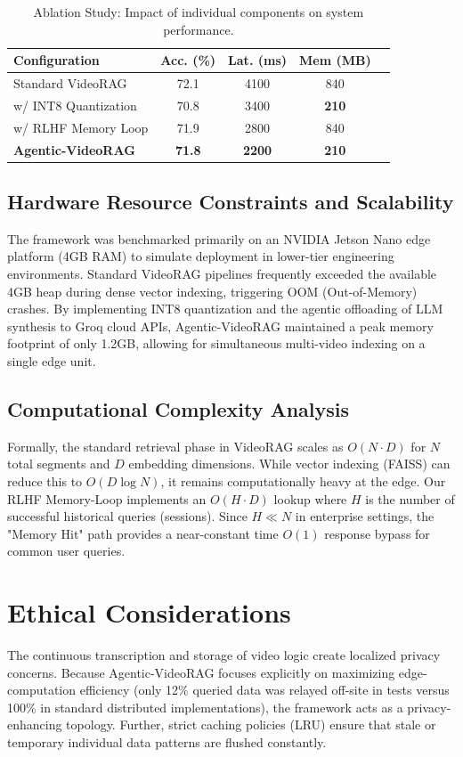 \documentclass[preprint,12pt]{elsarticle}
\begin{document}
\begin{table}[htbp]
\centering
\caption{Ablation Study: Impact of individual components on system performance.}
\label{tab:ablation}
\begin{tabular}{lcccc}
\toprule
\textbf{Configuration} & \textbf{Acc. (\%)} & \textbf{Lat. (ms)} & \textbf{Mem (MB)} \\
\midrule
Standard VideoRAG      & 72.1 & 4100 & 840 \\
w/ INT8 Quantization   & 70.8 & 3400 & \textbf{210} \\
w/ RLHF Memory Loop    & 71.9 & 2800 & 840 \\
\textbf{Agentic-VideoRAG} & \textbf{71.8} & \textbf{2200} & \textbf{210} \\
\bottomrule
\end{tabular}
\end{table}

\subsection{Hardware Resource Constraints and Scalability}
The framework was benchmarked primarily on an NVIDIA Jetson Nano edge platform (4GB RAM) to simulate deployment in lower-tier engineering environments. Standard VideoRAG pipelines frequently exceeded the available 4GB heap during dense vector indexing, triggering OOM (Out-of-Memory) crashes. By implementing INT8 quantization and the agentic offloading of LLM synthesis to Groq cloud APIs, Agentic-VideoRAG maintained a peak memory footprint of only 1.2GB, allowing for simultaneous multi-video indexing on a single edge unit.

\subsection{Computational Complexity Analysis}
Formally, the standard retrieval phase in VideoRAG scales as $O(N \cdot D)$ for $N$ total segments and $D$ embedding dimensions. While vector indexing (FAISS) can reduce this to $O(D \log N)$, it remains computationally heavy at the edge. Our RLHF Memory-Loop implements an $O(H \cdot D)$ lookup where $H$ is the number of successful historical queries (sessions). Since $H \ll N$ in enterprise settings, the "Memory Hit" path provides a near-constant time $O(1)$ response bypass for common user queries.

\section{Ethical Considerations}
The continuous transcription and storage of video logic create localized privacy concerns. Because Agentic-VideoRAG focuses explicitly on maximizing edge-computation efficiency (only 12\% queried data was relayed off-site in tests versus 100\% in standard distributed implementations), the framework acts as a privacy-enhancing topology. Further, strict caching policies (LRU) ensure that stale or temporary individual data patterns are flushed constantly. 
\end{document}
